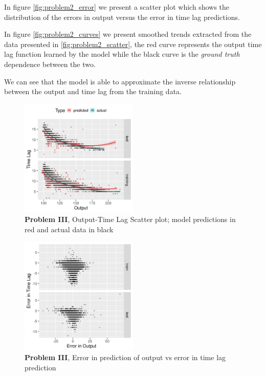 \documentclass[envcountsect,runningheads]{llncs}
\theoremstyle{etoile}
\begin{document}
In figure \ref{fig:problem2_error} we present a scatter plot which shows the distribution of the 
errors in output versus the error in time lag predictions.

In figure \ref{fig:problem2_curves} we present smoothed trends extracted from the data presented in 
\ref{fig:problem2_scatter}, the red curve represents the output time lag function learned by the model 
while the black curve is the \emph{ground truth} dependence between the two. 

We can see that the model is able to approximate the inverse relationship between the output and 
time lag from the training data.

\begin{figure}[h]
\vspace{.3in}
\centerline{\includegraphics[width=0.5\textwidth]{figures/exp3_scatter_v_tl.png}}
\vspace{.3in}
\caption{\textbf{Problem III}, Output-Time Lag Scatter plot; model predictions in red and actual data in black}
\label{fig:problem3_scatter}
\end{figure}

\begin{figure}[h]
\vspace{.3in}
\centerline{\includegraphics[width=0.5\textwidth]{figures/exp3_scatter_errors.png}}
\vspace{.3in}
\caption{\textbf{Problem III}, Error in prediction of output vs error in time lag prediction}
\label{fig:problem3_error}
\end{figure}
\end{document}
